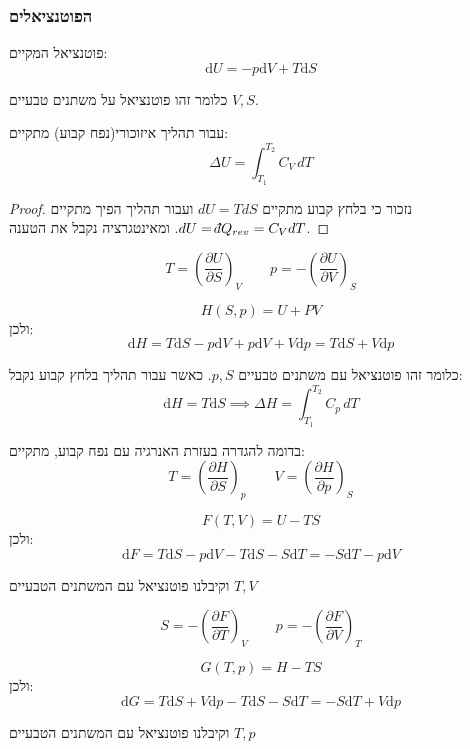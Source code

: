 \documentclass{tstextbook}
\begin{document}
\subsubsection{הפוטנציאלים}

\begin{definition}
פוטנציאל  המקיים:
$$\mathrm{d}U=-p\mathrm{d}V+T\mathrm{d}S$$

\end{definition}
כלומר זהו פוטנציאל על משתנים טבעיים \(V,S\).

\begin{proposition}
עבור תהליך איזוכורי(נפח קבוע) מתקיים:
$$\Delta U = \int_{T_{1}}^{T_{2}} C_{V} \, dT $$

\end{proposition}
\begin{proof}
נזכור כי בלחץ קבוע מתקיים \(dU=TdS\) ועבור תהליך הפיך מתקיים \(dU=\;\bar{}\mkern-7.5mu dQ_{rev}=C_{V}dT\). ומאינטגרציה נקבל את הטענה.

\end{proof}
\begin{proposition}
$$T=\left(\frac{\partial U}{\partial S}\right)_{V}\qquad p=-\left(\frac{\partial U}{\partial V}\right)_{S}$$

\end{proposition}
\begin{definition}[אנטלפיה]
$$H(S,p)=U+PV$$
ולכן:
$$\mathrm{d}H=T\mathrm{d}S-p\mathrm{d}V+p\mathrm{d}V+V\mathrm{d}p=T\mathrm{d}S+V\mathrm{d}p$$

\end{definition}
כלומר זהו פוטנציאל עם משתנים טבעיים \(p,S\).
כאשר עבור תהליך בלחץ קבוע נקבל: 
$$\mathrm{d}H=T\mathrm{d}S\implies \Delta H = \int_{T_{1}}^{T_{2}} C_{p} \, dT$$

\begin{corollary}
בדומה להגדרה בעזרת האנרגיה עם נפח קבוע, מתקיים:
$$T=\left(\frac{\partial H}{\partial S}\right)_{p}\qquad V=\left(\frac{\partial H}{\partial p}\right)_{S}$$

\end{corollary}
\begin{definition}
$$F(T,V)=U-TS$$
ולכן:
$$\mathrm{d}F=T\mathrm{d}S-p\mathrm{d}V-T\mathrm{d}S-S\mathrm{d}T=-S\mathrm{d}T-p\mathrm{d}V$$

\end{definition}
וקיבלנו פוטנציאל עם המשתנים הטבעיים \(T,V\)

\begin{corollary}
$$S=-\left(\frac{\partial F}{\partial T}\right)_{V}\qquad p=-\left({\frac{\partial F}{\partial V}}\right)_{T}$$

\end{corollary}
\begin{definition}
$$G(T,p)=H-TS$$
ולכן:
$$\mathrm{d}G=T\mathrm{d}S+V\mathrm{d}p-T\mathrm{d}S-S\mathrm{d}T=-S\mathrm{d}T+V\mathrm{d}p$$

\end{definition}
וקיבלנו פוטנציאל עם המשתנים הטבעיים \(T,p\)
\end{document}
